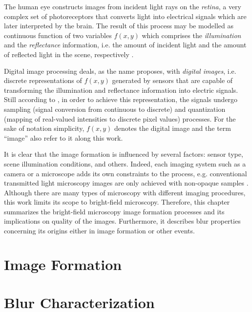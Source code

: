 



The human eye constructs images from incident light rays on the \emph{retina}, a very complex set of photoreceptors that converts light into electrical signals which are later interpreted by the brain. The result of this process may be modelled as continuous function of two variables $f(x,y)$ which comprises the \emph{illumination} and the \emph{reflectance} information, i.e. the amount of incident light and the amount of reflected light in the scene, respectively \cite{gonzalez2018digital}.

Digital image processing deals, as the name proposes, with \emph{digital images}, i.e. discrete representations of $f(x,y)$ generated by sensors that are capable of transforming the illumination and reflectance information into electric signals. Still according to , in order to achieve this representation, the signals undergo sampling (signal conversion from continuous to discrete) and quantization (mapping of real-valued intensities to discrete pixel values) processes. For the sake of notation simplicity, $f(x,y)$ denotes the digital image and the term ``image'' also refer to it along this work.

It is clear that the image formation is influenced by several factors: sensor type, scene illumination conditions, and others. Indeed, each imaging system such as a camera or a microscope adds its own constraints to the process, e.g. conventional transmitted light microscopy images are only achieved with non-opaque samples \cite{rudi2020contrast}. Although there are many types of microscopy with different imaging procedures, this work limits its scope to bright-field microscopy. Therefore, this chapter summarizes the bright-field microscopy image formation processes and its implications on quality of the images. Furthermore, it describes blur properties concerning its origins either in image formation or other events. 

\section{Image Formation}


\section{Blur Characterization}

